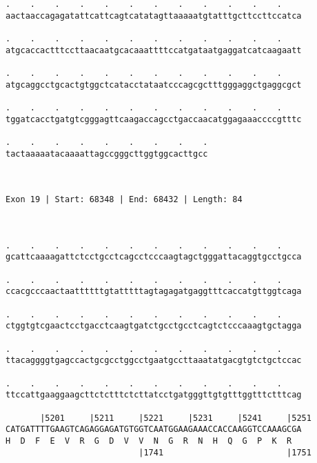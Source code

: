 \documentclass{article}
\begin{document}
\begin{Verbatim}
.    .    .    .    .    .    .    .    .    .    .    .    
aactaaccagagatattcattcagtcatatagttaaaaatgtatttgcttccttccatca
                                                            
.    .    .    .    .    .    .    .    .    .    .    .    
atgcaccactttccttaacaatgcacaaattttccatgataatgaggatcatcaagaatt
                                                            
.    .    .    .    .    .    .    .    .    .    .    .    
atgcaggcctgcactgtggctcatacctataatcccagcgctttgggaggctgaggcgct
                                                            
.    .    .    .    .    .    .    .    .    .    .    .    
tggatcacctgatgtcgggagttcaagaccagcctgaccaacatggagaaaccccgtttc
                                                            
.    .    .    .    .    .    .    .    .
tactaaaaatacaaaattagccgggcttggtggcacttgcc
                                         
                                         
 
Exon 19 | Start: 68348 | End: 68432 | Length: 84



.    .    .    .    .    .    .    .    .    .    .    .    
gcattcaaaagattctcctgcctcagcctcccaagtagctgggattacaggtgcctgcca
                                                            
.    .    .    .    .    .    .    .    .    .    .    .    
ccacgcccaactaattttttgtatttttagtagagatgaggtttcaccatgttggtcaga
                                                            
.    .    .    .    .    .    .    .    .    .    .    .    
ctggtgtcgaactcctgacctcaagtgatctgcctgcctcagtctcccaaagtgctagga
                                                            
.    .    .    .    .    .    .    .    .    .    .    .    
ttacaggggtgagccactgcgcctggcctgaatgccttaaatatgacgtgtctgctccac
                                                            
.    .    .    .    .    .    .    .    .    .    .    .    
ttccattgaaggaagcttctctttctcttatcctgatgggttgtgtttggtttctttcag
                                                            
       |5201     |5211     |5221     |5231     |5241     |5251
CATGATTTTGAAGTCAGAGGAGATGTGGTCAATGGAAGAAACCACCAAGGTCCAAAGCGA
H  D  F  E  V  R  G  D  V  V  N  G  R  N  H  Q  G  P  K  R  
                           |1741                         |1751
  

\end{Verbatim}
\end{document}
